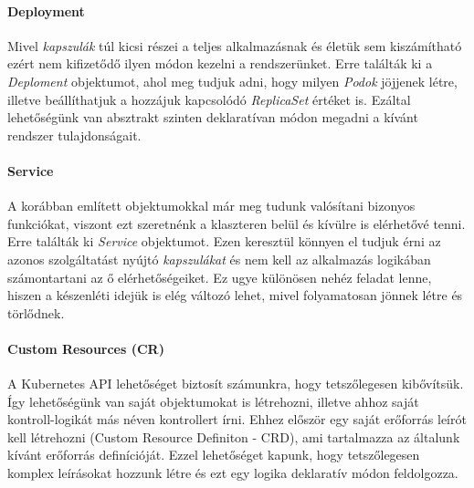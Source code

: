\paragraph{Deployment}
Mivel \textit{kapszulák} túl kicsi részei a teljes alkalmazásnak és életük sem kiszámítható ezért nem kifizetődő ilyen módon kezelni a rendszerünket.
Erre találták ki a \textit{Deploment} objektumot, ahol meg tudjuk adni, hogy milyen \textit{Podok} jöjjenek létre, illetve beállíthatjuk a hozzájuk kapcsolódó \textit{ReplicaSet} értéket is. 
Ezáltal lehetőségünk van absztrakt szinten deklaratívan módon megadni a kívánt rendszer tulajdonságait.

\paragraph{Service}
A korábban említett objektumokkal már meg tudunk valósítani bizonyos funkciókat, viszont ezt szeretnénk a klaszteren belül és kívülre is elérhetővé tenni.
Erre találták ki \textit{Service} objektumot. 
Ezen keresztül könnyen el tudjuk érni az azonos szolgáltatást nyújtó \textit{kapszulákat} és nem kell az alkalmazás logikában számontartani az ő elérhetőségeiket.
Ez ugye különösen nehéz feladat lenne, hiszen a készenléti idejük is elég változó lehet, mivel folyamatosan jönnek létre és törlődnek.

\paragraph{Custom Resources (CR)}
A Kubernetes API lehetőséget biztosít számunkra, hogy tetszőlegesen kibővítsük. 
Így lehetőségünk van saját objektumokat is létrehozni, illetve ahhoz saját kontroll-logikát más néven kontrollert írni.
Ehhez először egy saját erőforrás leírót kell létrehozni (Custom Resource Definiton - CRD), ami tartalmazza az általunk kívánt erőforrás definícióját.
Ezzel lehetőséget kapunk, hogy tetszőlegesen komplex leírásokat hozzunk létre és ezt egy logika deklaratív módon feldolgozza.


